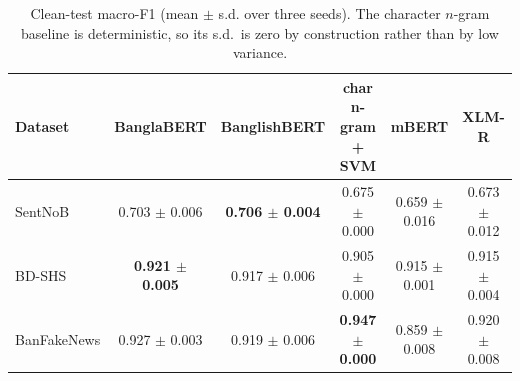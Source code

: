 \begin{table}[t]
\centering
\caption{Clean-test macro-F1 (mean $\pm$ s.d. over three seeds). The character $n$-gram baseline is deterministic, so its s.d.\ is zero by construction rather than by low variance.}
\label{tab:clean-baseline}
\begin{tabular}{lccccc}
\toprule
Dataset & BanglaBERT & BanglishBERT & char n-gram + SVM & mBERT & XLM-R \\
\midrule
SentNoB & 0.703 $\pm$ 0.006 & \textbf{0.706 $\pm$ 0.004} & 0.675 $\pm$ 0.000 & 0.659 $\pm$ 0.016 & 0.673 $\pm$ 0.012 \\
BD-SHS & \textbf{0.921 $\pm$ 0.005} & 0.917 $\pm$ 0.006 & 0.905 $\pm$ 0.000 & 0.915 $\pm$ 0.001 & 0.915 $\pm$ 0.004 \\
BanFakeNews & 0.927 $\pm$ 0.003 & 0.919 $\pm$ 0.006 & \textbf{0.947 $\pm$ 0.000} & 0.859 $\pm$ 0.008 & 0.920 $\pm$ 0.008 \\
\bottomrule
\end{tabular}
\end{table}
